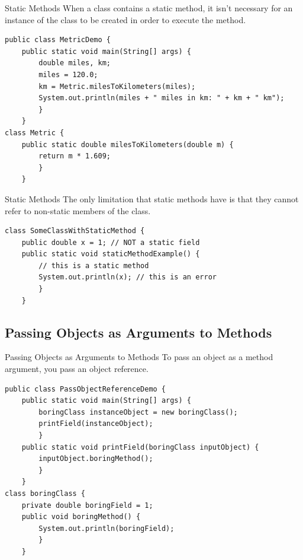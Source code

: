 \documentclass[11pt]{beamer}
\begin{document}
\begin{frame}[fragile]{Static Methods}
    When a class contains a static method, it isn't necessary for an instance of the class to be created in order to execute the method.
    \begin{lstlisting}
public class MetricDemo {
	public static void main(String[] args) {
		double miles, km;
		miles = 120.0;
		km = Metric.milesToKilometers(miles);
		System.out.println(miles + " miles in km: " + km + " km");
		}
	}
class Metric {
	public static double milesToKilometers(double m) {
		return m * 1.609;
		}
	}
    \end{lstlisting}
\end{frame}

\begin{frame}[fragile]{Static Methods}
    The only limitation that static methods have is that they cannot refer to non-static members of the class.
    \begin{lstlisting}
class SomeClassWithStaticMethod {
    public double x = 1; // NOT a static field
    public static void staticMethodExample() {
        // this is a static method
        System.out.println(x); // this is an error
        }
    }
    \end{lstlisting}
\end{frame}

\subsection{Passing Objects as Arguments to Methods}
\begin{frame}[fragile]{Passing Objects as Arguments to Methods}
    To pass an object as a method argument, you pass an object reference.
    \begin{lstlisting}
public class PassObjectReferenceDemo {
	public static void main(String[] args) {
		boringClass instanceObject = new boringClass();
		printField(instanceObject);
		}
	public static void printField(boringClass inputObject) {
		inputObject.boringMethod();
		}
	}
class boringClass {
	private double boringField = 1;
	public void boringMethod() {
		System.out.println(boringField);
		}
	}
    \end{lstlisting}
\end{frame}
\end{document}
